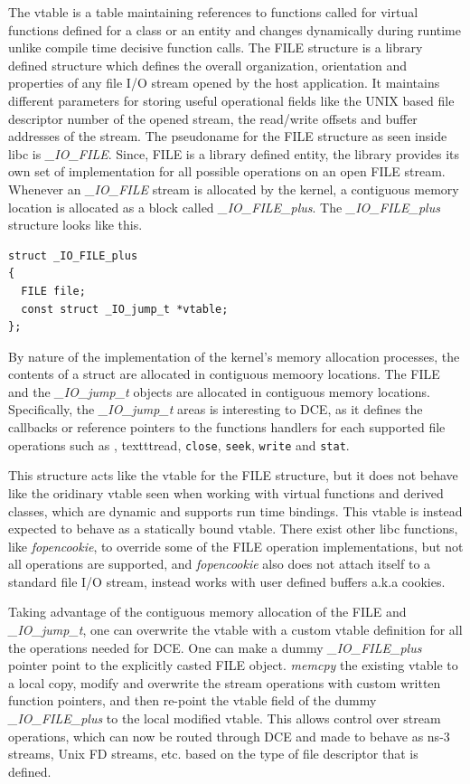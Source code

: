 \documentclass{sig-alternate}
\begin{document}
The vtable is a table maintaining references to functions called for virtual functions defined for a class or an entity and changes dynamically 
during runtime unlike compile time decisive function calls. The FILE structure is a library defined structure which defines the overall organization, 
orientation and properties of any file I/O stream opened
by the host application. It maintains different parameters for storing useful operational fields like the UNIX based file descriptor number of the 
opened stream, the read/write offsets and buffer addresses of the stream. The pseudoname for the FILE structure as seen inside libc is \textit{\_IO\_FILE}. 
Since, FILE is a library defined entity, the library provides its own set of implementation for all possible operations on an open FILE stream.
Whenever an \textit{\_IO\_FILE} stream is allocated by the kernel, a contiguous memory location is allocated as a block called \textit{\_IO\_FILE\_plus}. 
The \textit{\_IO\_FILE\_plus} structure looks like this.

\begin{lstlisting}[style=CStyle]     
struct _IO_FILE_plus
{
  FILE file;
  const struct _IO_jump_t *vtable;
};
\end{lstlisting}

By nature of the implementation of the kernel's memory allocation processes, the contents of a struct are allocated in contiguous memoory locations. 
The FILE and the \textit{\_IO\_jump\_t} objects are allocated in contiguous memory locations. Specifically, the 
\textit{\_IO\_jump\_t} areas is interesting to DCE, as it defines the callbacks or reference pointers to the functions handlers for each supported file 
operations such as , texttt{read}, \texttt{close}, \texttt{seek}, \texttt{write} and \texttt{stat}.

This structure acts like the vtable for the FILE structure, but it does not behave like the oridinary vtable seen when working with virtual functions 
and derived classes, which are dynamic and supports run time bindings. This vtable is instead expected to behave as a statically bound vtable.  There exist 
other libc functions, like \textit{fopencookie}, to override some of the FILE operation implementations, but not all operations are supported, and 
\textit{fopencookie} also does not attach itself to a standard file I/O stream, 
instead works  with user defined buffers a.k.a cookies. 

Taking advantage of the contiguous memory allocation of the FILE and \textit{\_IO\_jump\_t}, one can overwrite the vtable with a custom vtable definition for all
the operations needed for DCE. One can make a dummy \textit{\_IO\_FILE\_plus} 
pointer point to the explicitly casted FILE object. \textit{memcpy} the existing vtable to a local copy, modify and overwrite the stream operations with
custom written function pointers, and then re-point the vtable field of the dummy \textit{\_IO\_FILE\_plus} to the local modified vtable.  This allows
control over stream operations, which can now be routed through DCE and made to behave as ns-3 streams, Unix FD streams, etc. based on the type of file 
descriptor that is defined.
\end{document}
